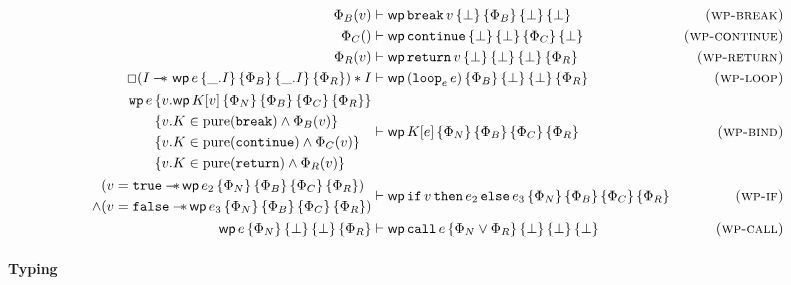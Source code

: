 \documentclass{article}
\numberwithin{algorithm}{section}
\newcommand{\progspec}[1]{\{ #1 \}}
\newcommand{\true}{\texttt{true}}
\newcommand{\false}{\texttt{false}}
\newcommand{\cloop}[1]{\texttt{loop}_{#1}\,}
\newcommand{\cbreak}{\texttt{break}\,}
\newcommand{\ccontinue}{\texttt{continue}}
\newcommand{\cif}{\texttt{if}\,}
\newcommand{\cthen}{\,\texttt{then}\,}
\newcommand{\celse}{\,\texttt{else}\,}
\newcommand{\creturn}{\texttt{return}\,}
\newcommand{\ccall}{\texttt{call}\,}
\newcommand{\pure}[1]{\text{pure}(#1)}
\newcommand{\wand}{-\mkern-8mu*\,}
\newcommand{\wpre}[5]{\textsf{wp}\, #1\, \progspec{#2}\, \progspec{#3}\, \progspec{#4}\, \progspec{#5}}
\begin{document}
$$
\begin{aligned}
    \Phi_B(v) &\vdash \wpre{\cbreak v}{\bot}{\Phi_B}{\bot}{\bot} & \textsc{(wp-break)} \\
    \Phi_C() &\vdash \wpre{\ccontinue}{\bot}{\bot}{\Phi_C}{\bot} & \textsc{(wp-continue)} \\
    \Phi_R(v) &\vdash \wpre{\creturn v}{\bot}{\bot}{\bot}{\Phi_R} & \textsc{(wp-return)} \\
    \Box(I \wand{}\, \wpre{e}{\_. I}{\Phi_B}{\_. I}{\Phi_R}) * I &\vdash \wpre{(\cloop{e}e)}{\Phi_B}{\bot}{\bot}{\Phi_R} & \textsc{(wp-loop)} \\
    \begin{aligned}
        \texttt{wp}\,e\,& \progspec{v. \wpre{K[v]}{\Phi_N}{\Phi_B}{\Phi_C}{\Phi_R}} \\
                        & \progspec{v. K \in \pure{\cbreak\!} \land \Phi_B(v)} \\
                        & \progspec{v. K \in \pure{\ccontinue} \land \Phi_C(v)} \\
                        & \progspec{v. K \in \pure{\creturn\!} \land \Phi_R(v)}
    \end{aligned} &\vdash \wpre{K[e]}{\Phi_N}{\Phi_B}{\Phi_C}{\Phi_R} & \textsc{(wp-bind)} \\
    \begin{aligned}
        &(v = \true \wand \wpre{e_2}{\Phi_N}{\Phi_B}{\Phi_C}{\Phi_R}) \\
        \land &(v = \false \wand \wpre{e_3}{\Phi_N}{\Phi_B}{\Phi_C}{\Phi_R})
    \end{aligned} &\vdash \wpre{\cif v \cthen e_2 \celse e_3}{\Phi_N}{\Phi_B}{\Phi_C}{\Phi_R} & \textsc{(wp-if)} \\
    \wpre{e}{\Phi_N}{\bot}{\bot}{\Phi_R} &\vdash \wpre{\ccall e}{\Phi_N \lor \Phi_R}{\bot}{\bot}{\bot} & \textsc{(wp-call)}
\end{aligned}
$$


\paragraph{Typing}
\end{document}
